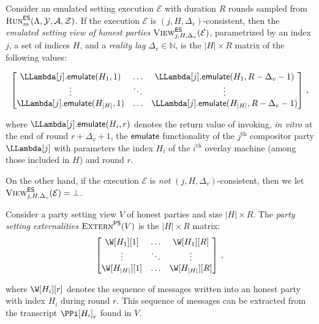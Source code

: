 \begin{definition}
  Consider an emulated setting execution $\mathcal{E}$ with duration $R$ rounds
  sampled from $\textsc{Run}^{\textsf{ES}}_m(\Lambda, \mathcal{Y}, \mathcal{A}, \mathcal{Z})$.
  If the execution $\mathcal{E}$ is $(j,H,\Delta_v)$-consistent, then
  the \emph{emulated setting view of honest parties} $\textsc{View}^{\textsf{ES}}_{j,H,\Delta_v}(\mathcal{E})$,
  parametrized by an index $j$, a set of indices $H$, and a \emph{reality lag} $\Delta_v \in \mathbb{N}$,
  is the $|H| \times R$ matrix of the following values:

  \[
  \begin{bmatrix}
    \LLambda[j].\emulateMachine(H_1, 1) & \ldots & \LLambda[j].\emulateMachine(H_1, R - \Delta_v - 1)\\
                                 \vdots & \ddots & \vdots \\
    \LLambda[j].\emulateMachine(H_{|H|}, 1) & \ldots & \LLambda[j].\emulateMachine(H_{|H|}, R - \Delta_v - 1)
  \end{bmatrix}\,,
  \]

  where $\LLambda[j].\emulateMachine(H_i, r)$ denotes the return value of invoking,
  \emph{in vitro} at the end of round $r + \Delta_v + 1$,
  the $\textsf{emulate}$ functionality of the $j^\text{th}$ compositor party $\LLambda[j]$
  with parameters the index $H_i$ of the $i^\text{th}$ overlay machine (among those
  included in $H$) and round $r$.

  On the other hand, if the execution $\mathcal{E}$ is \emph{not} $(j,H,\Delta_v)$-consistent, then
  we let $\textsc{View}^{\textsf{ES}}_{j,H,\Delta_v}(\mathcal{E}) = \bot$.
\end{definition}

\begin{definition}
  Consider a party setting view $V$ of honest parties and size $|H| \times R$.
  The \emph{party setting externalities} $\textsc{Extern}^{\textsf{PS}}(V)$ is the $|H| \times R$ matrix:
  \[
  \begin{bmatrix}
    \W[H_1][1] &\ldots& \W[H_1][R]\\
         \vdots &\ddots& \vdots     \\
    \W[H_{|H|}][1] &\ldots& \W[H_{|H|}][R]
  \end{bmatrix}\,,
  \]

  where $\W[H_i][r]$ denotes the sequence of messages written into an honest party
  with index $H_i$ during round $r$. This sequence of messages can be extracted from
  the transcript $\PPi[H_i]_r$ found in $V$.
\end{definition}

